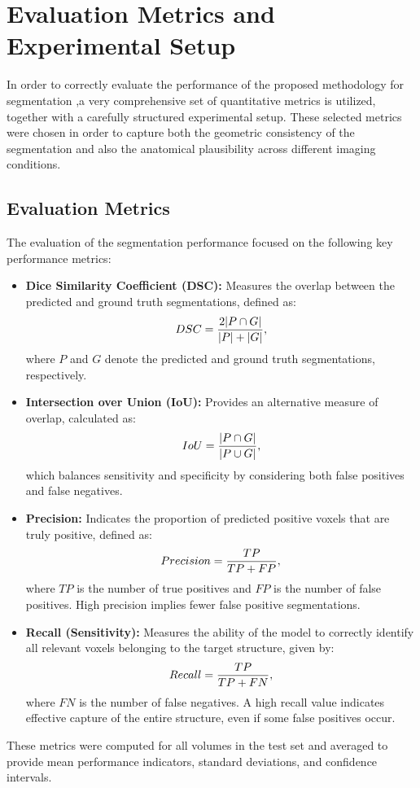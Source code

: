 \section{Evaluation Metrics and Experimental Setup}
In order to correctly evaluate the performance of the proposed methodology for segmentation ,a very comprehensive set of quantitative metrics is utilized, together with a carefully structured experimental setup. These selected metrics were chosen in order to capture both the geometric consistency of the segmentation and also the anatomical plausibility across different imaging conditions.

\subsection{Evaluation Metrics}
The evaluation of the segmentation performance focused on the following key performance metrics:

\begin{itemize}
\item \textbf{Dice Similarity Coefficient (DSC):} Measures the overlap between the predicted and ground truth segmentations, defined as:
\begin{equation}
\addcontentsline{equ}{equations}{\protect\numberline{\theequation}Dice Coefficient}
DSC = \frac{2|P \cap G|}{|P| + |G|},
\end{equation}
where $P$ and $G$ denote the predicted and ground truth segmentations, respectively.
\item \textbf{Intersection over Union (IoU):} Provides an alternative measure of overlap, calculated as:
\begin{equation}
\addcontentsline{equ}{equations}{\protect\numberline{\theequation}Intersection over Union (IoU)}
IoU = \frac{|P \cap G|}{|P \cup G|},
\end{equation}
which balances sensitivity and specificity by considering both false positives and false negatives.
\item \textbf{Precision:} Indicates the proportion of predicted positive voxels that are truly positive, defined as:
\begin{equation}
\addcontentsline{equ}{equations}{\protect\numberline{\theequation}Precision}
Precision = \frac{TP}{TP + FP},
\end{equation}
where $TP$ is the number of true positives and $FP$ is the number of false positives. High precision implies fewer false positive segmentations.
\item \textbf{Recall (Sensitivity):} Measures the ability of the model to correctly identify all relevant voxels belonging to the target structure, given by:
\begin{equation}
\addcontentsline{equ}{equations}{\protect\numberline{\theequation}Recall}
Recall = \frac{TP}{TP + FN},
\end{equation}
where $FN$ is the number of false negatives. A high recall value indicates effective capture of the entire structure, even if some false positives occur.
\end{itemize}
These metrics were computed for all volumes in the test set and averaged to provide mean performance indicators, standard deviations, and confidence intervals.

